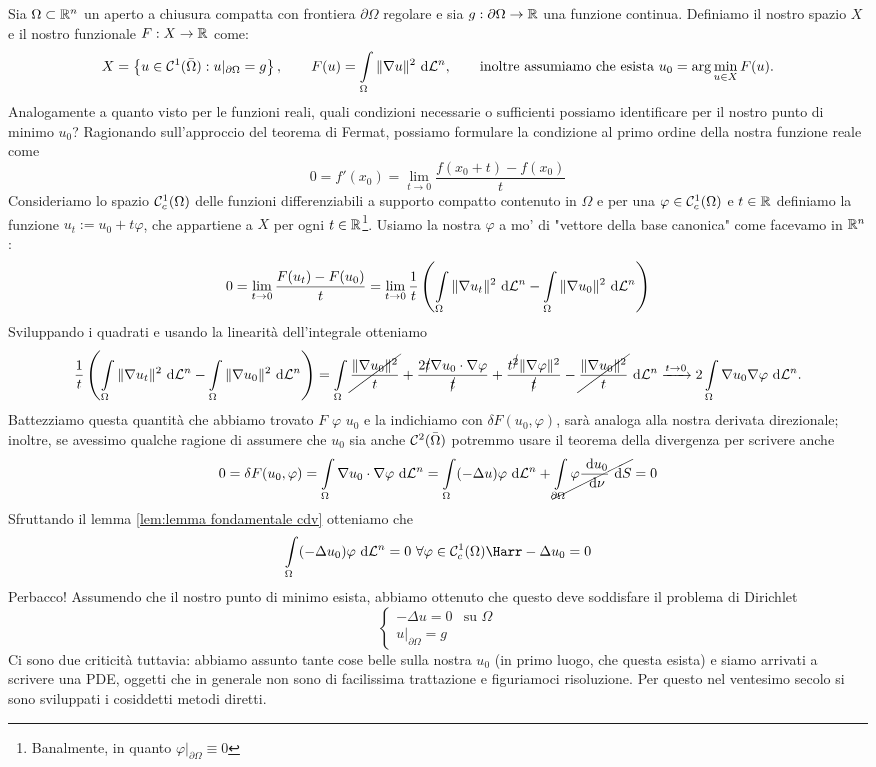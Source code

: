 \documentclass[openany]{book}
\begin{document}
Sia $\Omega\subset\mathbb{R}^n$ un aperto a chiusura compatta con frontiera $\partial\Omega$ regolare e sia $g : \partial\Omega\to\mathbb{R}$ una funzione continua. Definiamo il nostro spazio $X$ e il nostro funzionale $F : X\to\mathbb{R}$ come:
\[ X = \left\{ u \in \mc{C}^1(\bar{\Omega}) : u|_{\partial\Omega} = g \right\}, \qquad F(u) = \intop_\Omega \|\nabla u\|^2 \de \L^n, \qquad\text{inoltre assumiamo che esista } u_0 = \arg\min_{u \in X} F(u). \]
Analogamente a quanto visto per le funzioni reali, quali condizioni necessarie o sufficienti possiamo identificare per il nostro punto di minimo $u_0$? Ragionando sull'approccio del teorema di Fermat, possiamo formulare la condizione al primo ordine della nostra funzione reale come 
\[ 0 = f'(x_0) = \lim_{t\to 0} \frac{f(x_0+t) - f(x_0)}{t} \]
Consideriamo lo spazio $\mathcal{C}^1_c(\Omega)$ delle funzioni differenziabili a supporto compatto contenuto in $\Omega$ e per una $\varphi \in \mathcal{C}^1_c(\Omega)$ e $t \in \mathbb{R}$ definiamo la funzione $u_t := u_0 + t\varphi$, che appartiene a $X$ per ogni $t \in \mathbb{R}$\footnote{Banalmente, in quanto $\varphi|_{\partial\Omega} \equiv 0$}. Usiamo la nostra $\varphi$ a mo' di "vettore della base canonica" come facevamo in $\mathbb{R}^n$:
\[0 = \lim_{t\to 0} \frac{F(u_t) - F(u_0)}{t} = \lim_{t\to 0} \frac{1}{t} \left( \intop_\Omega \|\nabla u_t\|^2 \de \L^n - \intop_\Omega \|\nabla u_0\|^2 \de \L^n \right)\]
Sviluppando i quadrati e usando la linearità dell'integrale otteniamo
\[ \frac{1}{t} \left( \intop_\Omega \|\nabla u_t\|^2 \de \L^n - \intop_\Omega \|\nabla u_0\|^2 \de \L^n \right) =  \intop_\Omega \cancel{\frac{\|\nabla u_0\|^2}{t}} + \frac{2\cancel{t} \nabla u_0 \cdot \nabla \varphi}{\cancel{t}} + \frac{t^{\cancel{2}}\|\nabla \varphi\|^2}{\cancel{t}} -\cancel{\frac{\|\nabla u_0\|^2}{t}} \de \L^n \xrightarrow{t \to 0} 2\intop_\Omega \nabla u_0 \nabla \varphi \de\L^n.\]
Battezziamo questa quantità che abbiamo trovato  $F$  $\varphi$  $u_0$ e la indichiamo con $\delta F(u_0,\varphi)$, sarà analoga alla nostra derivata direzionale; inoltre, se avessimo qualche ragione di assumere che $u_0$ sia anche $\mathcal{C}^2(\bar{\Omega})$ potremmo usare il teorema della divergenza per scrivere anche
\[ 0 = \delta F(u_0,\varphi) = \intop_{\Omega} \nabla u_0 \cdot \nabla\varphi \de\L^n = \intop_{\Omega}(-\Delta u)\varphi \de\L^n + \cancel{\intop_{\partial\Omega} \varphi \frac{\de u_0}{\de \nu} \de S } = 0\]
Sfruttando il lemma \ref{lem:lemma fondamentale cdv} otteniamo che
\[ \intop_{\Omega} (-\Delta u_0) \varphi \de\L^n = 0\ \forall \varphi \in \mc{C}^1_c(\Omega)  \Harr -\Delta u_0 = 0 \]
Perbacco! Assumendo che il nostro punto di minimo esista, abbiamo ottenuto che questo deve soddisfare il problema di Dirichlet
\[ \begin{cases} -\Delta u = 0 & \text{su }\Omega \\ u|_{\partial\Omega} = g \end{cases}\]
Ci sono due criticità tuttavia: abbiamo assunto tante cose belle sulla nostra $u_0$ (in primo luogo, che questa esista) e siamo arrivati a scrivere una PDE, oggetti che in generale non sono di facilissima trattazione e figuriamoci risoluzione. Per questo nel ventesimo secolo si sono sviluppati i cosiddetti metodi diretti.
\end{document}

